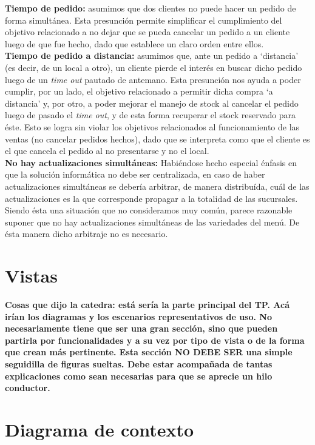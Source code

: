 \documentclass[a4paper,10pt]{article}
\begin{document}
\noindent
\textbf{Tiempo de pedido:} asumimos que dos clientes no puede hacer un pedido de forma simultánea. Esta presunción permite simplificar el cumplimiento del objetivo relacionado a no dejar que se pueda cancelar un pedido a un cliente luego de que fue hecho, dado que establece un claro orden entre ellos. \\
\textbf{Tiempo de pedido a distancia:} asumimos que, ante un pedido a `distancia' (es decir, de un local a otro), un cliente pierde el interés en buscar dicho pedido luego de un \textit{time out} pautado de antemano. Esta presunción nos ayuda a poder cumplir, por un lado, el objetivo relacionado a permitir dicha compra `a distancia' y, por otro, a poder mejorar el manejo de stock al cancelar el pedido luego de pasado el \textit{time out}, y de esta forma recuperar el stock reservado para éste. Esto se logra sin violar los objetivos relacionados al funcionamiento de las ventas (no cancelar pedidos hechos), dado que se interpreta como que el cliente es el que cancela el pedido al no presentarse y no el local.\\
\textbf{No hay actualizaciones simultáneas:} Habiéndose hecho especial énfasis en que la solución informática no debe ser centralizada, en caso de haber actualizaciones simultáneas se debería arbitrar, de manera distribuída, cuál de las actualizaciones es la que corresponde propagar a la totalidad de las sucursales. Siendo ésta una situación que no consideramos muy común, parece razonable suponer que no hay actualizaciones simultáneas de las variedades del menú. De ésta manera dicho arbitraje no es necesario. \\ 
\newpage
\section*{Vistas}

\textbf{Cosas que dijo la catedra: está sería la parte principal del TP. Acá irían los diagramas y los escenarios representativos de uso. No necesariamente tiene que ser una gran sección, sino que pueden partirla por funcionalidades y a su vez por tipo de vista o de la forma que crean más pertinente. Esta sección NO DEBE SER una simple seguidilla de figuras sueltas. Debe estar acompañada de tantas explicaciones como sean necesarias para que se aprecie un hilo conductor.}

\section*{Diagrama de contexto}
\end{document}
